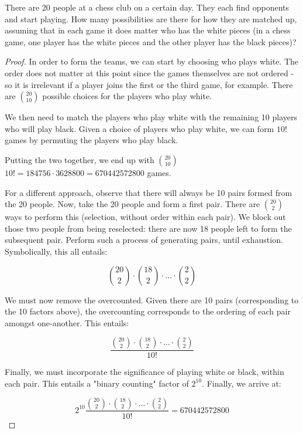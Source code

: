 \begin{exercise}{6}
There are 20 people at a chess club on a certain day. They each find opponents and
start playing. How many possibilities are there for how they are matched up, assuming
that in each game it does matter who has the white pieces (in a chess game, one player
has the white pieces and the other player has the black pieces)?
\end{exercise}

\begin{proof}
    In order to form the teams, we can start by choosing who plays white. The order does not matter at this point since the games themselves are not ordered - so it is irrelevant if a player joins the first or the third game, for example. There are $20 \choose 10$ possible choices for the players who play white.

    We then need to match the players who play white with the remaining 10 players who will play black. Given a choice of players who play white, we can form $10!$ games by permuting the players who play black.

    Putting the two together, we end up with $20 \choose 10 $ $  10! = 184756 \cdot 3628800 = 670442572800$  games.

    \vspace{2em}

    For a different approach, observe that there will always be 10 pairs formed from the 20 people. Now, take the 20 people and form a first pair. There are $20 \choose 2$ ways to perform this (selection, without order within each pair). We block out those two people from being reselected: there are now 18 people left to form the subsequent pair. Perform such a process of generating pairs, until exhaustion. Symbolically, this all entails: 
    
    $${20 \choose 2} \cdot{18 \choose 2} \cdot \dots \cdot {2 \choose 2}$$

    We must now remove the overcounted. Given there are 10 pairs (corresponding to the 10 factors above), the overcounting corresponds to the ordering of each pair amongst one-another. This entails:

    $$\frac{ {20 \choose 2} \cdot{18 \choose 2} \cdot \dots \cdot {2 \choose 2}}{10!}$$

    Finally, we must incorporate the significance of playing white or black, within each pair. This entails a "binary counting" factor of $2^10$. Finally, we arrive at:
    
    $$2^{10}\frac{ {20 \choose 2} \cdot{18 \choose 2} \cdot \dots \cdot {2 \choose 2}}{10!} = 670442572800$$
    
\end{proof}


